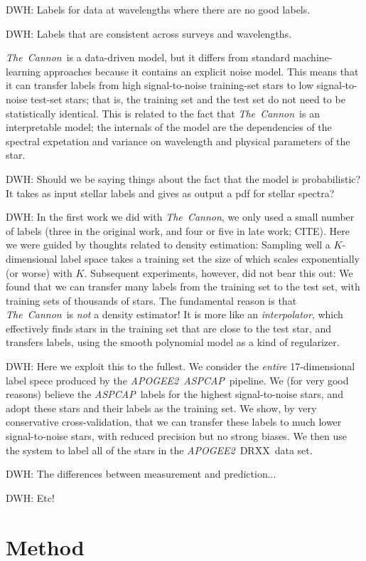 \documentclass[12pt,preprint]{aastex}
\newcommand{\project}[1]{\textsl{#1}}
\newcommand{\thecannon}{\project{The~Cannon}}
\newcommand{\acronym}[1]{\small{#1}}
\newcommand{\apogee}{\project{\acronym{APOGEE2}}}
\newcommand{\aspcap}{\project{\acronym{ASPCAP}}}
\newcommand{\dr}{\acronym{DRXX}}
\begin{document}
DWH: Labels for data at wavelengths where there are no good labels.

DWH: Labels that are consistent across surveys and wavelengths.

\thecannon\ is a data-driven model, but it differs from standard machine-learning
approaches because it contains an explicit noise model.
This means that it can transfer labels from high signal-to-noise training-set
stars to low signal-to-noise test-set stars; that is, the training set and 
the test set do not need to be statistically identical.
This is related to the fact that \thecannon\ is an interpretable model;
the internals of the model are the dependencies of the spectral expetation
and variance on wavelength and physical parameters of the star.

DWH: Should we be saying things about the fact that the model is probabilistic?
It takes as input stellar labels and gives as output a pdf for stellar spectra?

DWH: In the first work we did with \thecannon, we only used a small
number of labels (three in the original work, and four or five in late
work; CITE).
Here we were guided by thoughts related to density estimation:
Sampling well a $K$-dimensional label space takes a training set the
size of which scales exponentially (or worse) with $K$.
Subsequent experiments, however, did not bear this out:
We found that we can transfer many labels from the training set to
the test set, with training sets of thousands of stars.
The fundamental reason is that \thecannon\ is \emph{not} a density estimator!
It is more like an \emph{interpolator}, which effectively finds stars in
the training set that are close to the test star, and transfers labels,
using the smooth polynomial model as a kind of regularizer.

DWH: Here we exploit this to the fullest.
We consider the \emph{entire} 17-dimensional label spece produced by
the \apogee\ \aspcap\ pipeline.
We (for very good reasons) believe the \aspcap\ labels for the highest
signal-to-noise stars, and adopt these stars and their labels as the
training set.
We show, by very conservative cross-validation, that we can transfer these
labels to much lower signal-to-noise stars, with reduced precision but no
strong biases.
We then use the system to label all of the stars in the \apogee\ \dr\ data set.

DWH: The differences between measurement and prediction...

DWH: Etc!

\section{Method}
\end{document}
